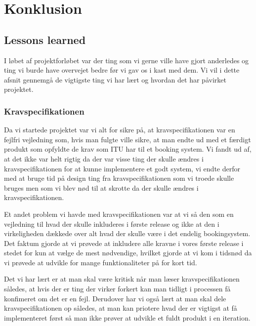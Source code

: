 \chapter{Konklusion}
\label{Konklusion}
\section{Lessons learned}
\label{Konklusion_Lessons}
I løbet af projektforløbet var der ting som vi gerne ville have gjort anderledes og ting vi burde have overvejet bedre før vi gav os i kast med dem. Vi vil i dette afsnit gennemgå de vigtigste ting vi har lært og hvordan det har påvirket projektet.

\subsection{Kravspecifikationen}
\label{Konklusion_Lessons_Krav}
Da vi startede projektet var vi alt for sikre på, at kravspecifikationen var en fejlfri vejledning som, hvis man fulgte ville sikre, at man endte ud med et færdigt produkt som opfyldte de krav som ITU har til et booking system. Vi fandt ud af, at det ikke var helt rigtig da der var visse ting der skulle ændres i kravspecifikationen for at kunne implementere et godt system, vi endte derfor med at bruge tid på design ting fra kravspecifikationen som vi troede skulle bruges men som vi blev nød til at skrotte da der skulle ændres i kravspecifikationen.

Et andet problem vi havde med kravspecifikationen var at vi så den som en vejledning til hvad der skulle inkluderes i første release og ikke at den i virkeligheden dækkede over alt hvad der skulle være i det endelig bookingsystem. Det faktum gjorde at vi prøvede at inkludere alle kravne i vores første release i stedet for kun at vælge de mest nødvendige, hvilket gjorde at vi kom i tidsnød da vi prøvede at udvikle for mange funktionaliteter på for kort tid.

Det vi har lært er at man skal være kritisk når man  læser kravspecifikationen således, at hvis der er ting der virker forkert kan man tidligt i processen få konfimeret om det er en fejl. Derudover har vi også lært at man skal dele kravspecifikationen op således, at man kan priotere hvad der er vigtigst at få implementeret først så man ikke prøver at udvikle et fuldt produkt i en iteration.

